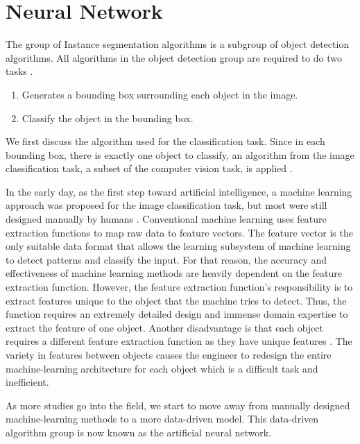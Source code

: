\chapter{Neural Network} \label{chap:neural_network}

The group of Instance segmentation algorithms is a subgroup of object detection algorithms. All algorithms in the object detection group are required to do two tasks \cite{overview_cv_task}. 
\begin{enumerate}
    \item Generates a bounding box surrounding each object in the image.
    \item Classify the object in the bounding box.
\end{enumerate}
We first discuss the algorithm used for the classification task. Since in each bounding box, there is exactly one object to classify, an algorithm from the image classification task, a subset of the computer vision task, is applied \cite{overview_cv_task}.

In the early day, as the first step toward artificial intelligence, a machine learning approach was proposed for the image classification task, but most were still designed manually by humans \cite{traditional_machine_learning}. Conventional machine learning uses feature extraction functions to map raw data to feature vectors. The feature vector is the only suitable data format that allows the learning subsystem of machine learning to detect patterns and classify the input. For that reason, the accuracy and effectiveness of machine learning methods are heavily dependent on the feature extraction function. However, the feature extraction function's responsibility is to extract features unique to the object that the machine tries to detect. Thus, the function requires an extremely detailed design and immense domain expertise to extract the feature of one object. Another disadvantage is that each object requires a different feature extraction function as they have unique features \cite{traditional_machine_learning}. The variety in features between objects causes the engineer to redesign the entire machine-learning architecture for each object which is a difficult task and inefficient.

As more studies go into the field, we start to move away from manually designed machine-learning methods to a more data-driven model. This data-driven algorithm group is now known as the artificial neural network.

